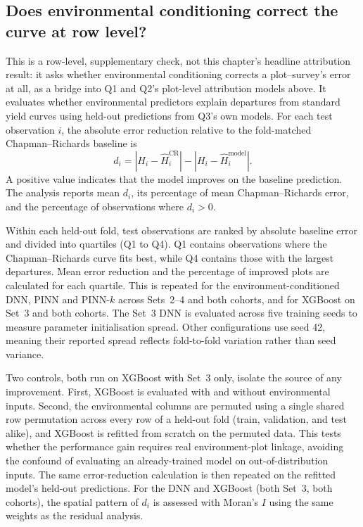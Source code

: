 \documentclass[logo,msc,ai]{infthesis}           %
\begin{document}
\subsection*{Does environmental conditioning correct the curve at row level?}
\label{sec:rq2a-method}
This is a row-level, supplementary check, not this chapter's headline attribution result: it asks whether environmental conditioning corrects a plot--survey's error at all, as a bridge into Q1 and Q2's plot-level attribution models above. It evaluates whether environmental predictors explain departures from standard yield curves using held-out predictions from Q3's own models. For each test observation $i$, the absolute error reduction relative to the fold-matched Chapman--Richards baseline is
\begin{equation}
d_i=\left|H_i-\hat H_i^{\mathrm{CR}}\right|-
\left|H_i-\hat H_i^{\mathrm{model}}\right|.
\label{eq:residual-reduction}
\end{equation}
A positive value indicates that the model improves on the baseline prediction. The analysis reports mean $d_i$, its percentage of mean Chapman--Richards error, and the percentage of observations where $d_i>0$.

Within each held-out fold, test observations are ranked by absolute baseline error and divided into quartiles (Q1 to Q4). Q1 contains observations where the Chapman--Richards curve fits best, while Q4 contains those with the largest departures. Mean error reduction and the percentage of improved plots are calculated for each quartile. This is repeated for the environment-conditioned DNN, PINN and PINN-$k$ across Sets~2--4 and both cohorts, and for XGBoost on Set~3 and both cohorts. The Set~3 DNN is evaluated across five training seeds to measure parameter initialisation spread. Other configurations use seed 42, meaning their reported spread reflects fold-to-fold variation rather than seed variance.

Two controls, both run on XGBoost with Set~3 only, isolate the source of any improvement. First, XGBoost is evaluated with and without environmental inputs. Second, the environmental columns are permuted using a single shared row permutation across every row of a held-out fold (train, validation, and test alike), and XGBoost is refitted from scratch on the permuted data. This tests whether the performance gain requires real environment-plot linkage, avoiding the confound of evaluating an already-trained model on out-of-distribution inputs. The same error-reduction calculation is then repeated on the refitted model's held-out predictions. For the DNN and XGBoost (both Set~3, both cohorts), the spatial pattern of $d_i$ is assessed with Moran's $I$ using the same weights as the residual analysis.
\end{document}
